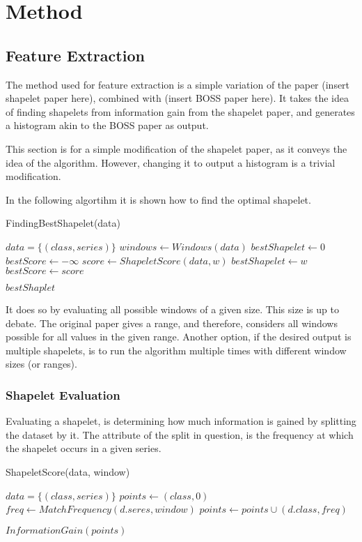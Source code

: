 \documentclass[../../main.tex]{subfiles}
\begin{document}
\footnotesize

\section{Method}
\subsection{Feature Extraction}
The method used for feature extraction is a simple variation of the paper (insert shapelet paper here), combined with (insert BOSS paper here). It takes the idea of finding shapelets from information gain from the shapelet paper, and generates a histogram akin to the BOSS paper as output.

This section is for a simple modification of the shapelet paper, as it conveys the idea of the algorithm. However, changing it to output a histogram is a trivial modification.

In the following algortihm it is shown how to find the optimal shapelet.

\begin{algorithm}
\caption{FindingBestShapelet(data)}
\begin{algorithmic}
\Require $data = \{(class, series)\}$
\State $windows \gets Windows(data)$ 
\State $bestShapelet \gets 0$
\State $bestScore \gets -\infty$
	\State $score \gets ShapeletScore(data, w)$
		\State $bestShapelet \gets w$
		\State $bestScore \gets score$
	\EndIf
\EndFor

\Return $bestShaplet$
\end{algorithmic}
\end{algorithm}

It does so by evaluating all possible windows of a given size. This size is up to debate. The original paper gives a range, and therefore, considers all windows possible for all values in the given range. Another option, if the desired output is multiple shapelets, is to run the algorithm multiple times with different window sizes (or ranges).

\subsubsection{Shapelet Evaluation}
Evaluating a shapelet, is determining how much information is gained by splitting the dataset by it. The attribute of the split in question, is the frequency at which the shapelet occurs in a given series.
\begin{algorithm}
\caption{ShapeletScore(data, window)}
\begin{algorithmic}
\Require $data = \{(class, series)\}$
\State $points \gets {(class, 0)}$
	\State $freq \gets MatchFrequency(d.seres, window)$
	\State $points \gets points \cup (d.class, freq)$
\EndFor

\Return $InformationGain(points)$
\end{algorithmic}
\end{algorithm}
\end{document}
